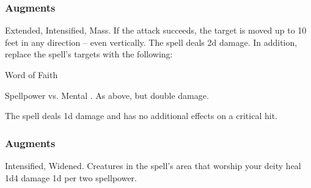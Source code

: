 \subsubsection{Augments}
 Extended, Intensified, Mass.
If the attack succeeds, the target is moved up to 10 feet in any direction -- even vertically.
The spell deals \minus2d damage.
In addition, replace
the spell's targets with the following:
\begin{augmenttargetinginfo}
\end{augmenttargetinginfo}
\begin{spellsection}{Word of Faith}
\begin{spellheader}
\end{spellheader}
\begin{spellcontent}
\begin{spelltargetinginfo}
\end{spelltargetinginfo}
\begin{spelleffects}
\begin{spellattack}{Spellpower vs. Mental}
\spellsuccess {}.
\spellcritical As above, but double damage.
\end{spellattack}
\end{spelleffects}
\end{spellcontent}
\begin{spellfooter}
\miscastexplode
\end{spellfooter}
\begin{spellcantrip}
The spell deals \minus1d damage and has no additional effects on a critical hit.
\end{spellcantrip}
\end{spellsection}
\subsubsection{Augments}
 Intensified, Widened.
Creatures in the spell's area that worship your deity heal 1d4 damage \plus1d per two spellpower.